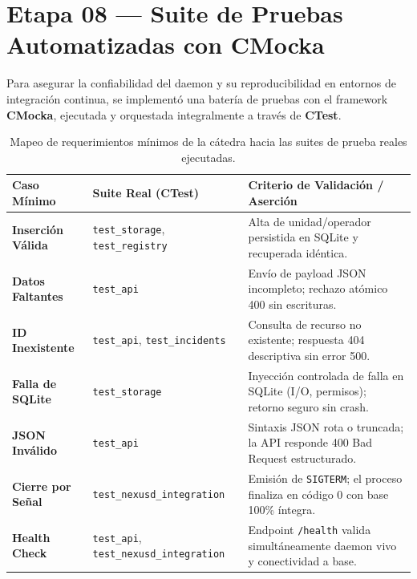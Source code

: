 \documentclass[10pt,a4paper]{article}
\begin{document}
\section{Etapa 08 — Suite de Pruebas Automatizadas con CMocka}

Para asegurar la confiabilidad del daemon y su reproducibilidad en entornos de integración continua, se implementó una batería de pruebas con el framework \textbf{CMocka}, ejecutada y orquestada integralmente a través de \textbf{CTest}.

\begin{table}[H]
    \centering
    \footnotesize
    \caption{Mapeo de requerimientos mínimos de la cátedra hacia las suites de prueba reales ejecutadas.}
    \label{tab:pruebas_cmocka}
    \begin{tabularx}{\textwidth}{p{2.4cm} >{\raggedright\arraybackslash}p{3.6cm} X}
        \toprule
        \rowcolor{tableheader}
        \textbf{Caso Mínimo} & \textbf{Suite Real (CTest)} & \textbf{Criterio de Validación / Aserción} \\
        \midrule
        \textbf{Inserción Válida} & \texttt{test\_storage}, \texttt{test\_registry} & Alta de unidad/operador persistida en SQLite y recuperada idéntica. \\
        \rowcolor{rowalt}
        \textbf{Datos Faltantes} & \texttt{test\_api} & Envío de payload JSON incompleto; rechazo atómico 400 sin escrituras. \\
        \textbf{ID Inexistente} & \texttt{test\_api}, \texttt{test\_incidents} & Consulta de recurso no existente; respuesta 404 descriptiva sin error 500. \\
        \rowcolor{rowalt}
        \textbf{Falla de SQLite} & \texttt{test\_storage} & Inyección controlada de falla en SQLite (I/O, permisos); retorno seguro sin crash. \\
        \textbf{JSON Inválido} & \texttt{test\_api} & Sintaxis JSON rota o truncada; la API responde 400 Bad Request estructurado. \\
        \rowcolor{rowalt}
        \textbf{Cierre por Señal} & \texttt{test\_nexusd\_integration} & Emisión de \texttt{SIGTERM}; el proceso finaliza en código 0 con base 100\% íntegra. \\
        \textbf{Health Check} & \texttt{test\_api}, \texttt{test\_nexusd\_integration} & Endpoint \texttt{/health} valida simultáneamente daemon vivo y conectividad a base. \\
        \bottomrule
    \end{tabularx}
\end{table}
\end{document}
